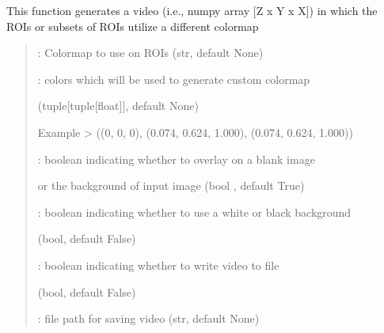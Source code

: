 \documentclass[letterpaper,10pt,english]{sphinxmanual}
\begin{document}
\begin{fulllineitems}
\label{\detokenize{Colorizer:Colorizer.colorize_video}}
\pysigstartsignatures
{}
\pysigstopsignatures
\sphinxAtStartPar
This function generates a video (i.e., numpy array {[}Z x Y x X{]})
in which the ROIs or subsets of ROIs utilize a different colormap
\begin{quote}
\begin{description}
\begin{DUlineblock}{0em}
\item[]  : Colormap to use on ROIs (str, default None)
\item[]  : colors which will be used to generate custom colormap
\item[] (tuple{[}tuple{[}float{]}{]}, default None)
\item[] Example \sphinxhyphen{}\textgreater{} ((0, 0, 0), (0.074, 0.624, 1.000), (0.074, 0.624, 1.000))
\item[]  : boolean indicating whether to overlay on a blank image
\item[] or the background of input image (bool , default True)
\item[]  : boolean indicating whether to use a white or black background
\item[] (bool, default False)
\item[]  : boolean indicating whether to write video to file
\item[] (bool, default False)
\item[]  : file path for saving video (str, default None)
\end{DUlineblock}


\end{description}
\end{quote}
\end{fulllineitems}
\end{document}

